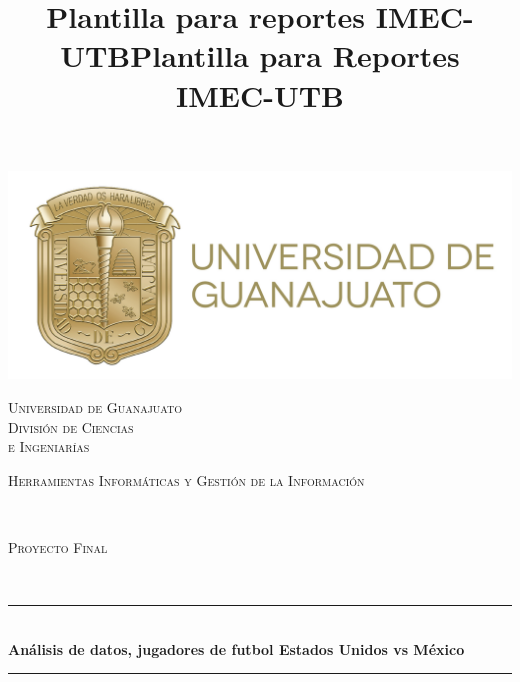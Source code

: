 \documentclass[10pt]{article}
\title{Plantilla para reportes IMEC-UTB}
\title{Plantilla para Reportes IMEC-UTB}
\begin{document}
\begin{center}																		%
\newcommand{\HRule}{\rule{\linewidth}{0.5mm}}									%

\begin{minipage}{0.48\textwidth} 
\centering
\includegraphics[scale = 0.3]{img/ug.jpg}
\end{minipage}

\vspace*{1.0cm}								%
\textsc{\huge Universidad de Guanajuato}\\[1.5cm]	

\textsc{\LARGE División de Ciencias \\ \vspace{5px} e Ingeniarías }\\[1.5cm]													%

\begin{minipage}{0.9\textwidth} 
\begin{center}																					%
\textsc{\LARGE Herramientas Informáticas y Gestión de la Información} \newline
\end{center}
\end{minipage}\\[0.5cm]
\begin{minipage}{0.9\textwidth} 
\begin{center}																					%
\textsc{\LARGE Proyecto Final}
\end{center}
\end{minipage}\\[0.5cm]    																				%
 			\vspace*{1cm}																		%
\HRule \\[0.4cm]																	%
{ \huge \bfseries Análisis de datos, jugadores de futbol Estados Unidos vs México}\\[0.4cm]	%
\HRule \\[1.5cm]																	%
\begin{minipage}{0.46\textwidth}													%
\begin{flushleft} \large															%


\end{flushleft}
\end{minipage}
\end{center}
\end{document}
